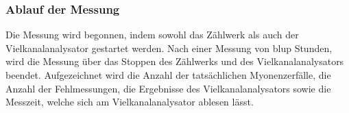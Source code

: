 \subsubsection{Ablauf der Messung}
Die Messung wird begonnen, indem sowohl das Zählwerk als auch der Vielkanalanalysator gestartet werden.
Nach einer Messung von blup Stunden, wird die Messung über das Stoppen des Zählwerks und des Vielkanalanalysators beendet.
Aufgezeichnet wird die Anzahl der tatsächlichen Myonenzerfälle, die Anzahl der Fehlmessungen, die Ergebnisse des Vielkanalanalysators sowie die Messzeit, welche sich am Vielkanalanalysator ablesen lässt.
